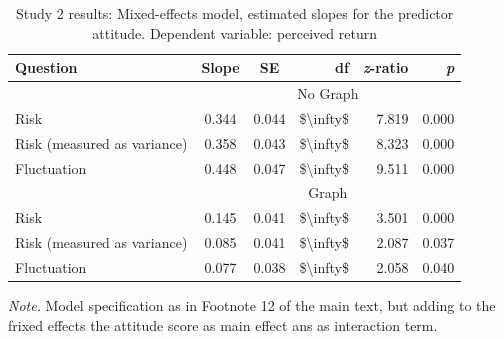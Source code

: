 \begin{table}[H]
\begin{center}
\begin{threeparttable}
\caption{Study 2 results: Mixed-effects model, estimated slopes for the predictor attitude. Dependent variable: perceived return}
\label{sup:tab:study2_attitude_lm_trends}
\begin{tabular}{lccrrr}
\toprule
Question & Slope & SE & df & \textit{z}-ratio & \textit{p}\\
\midrule
& \multicolumn{5}{c}{No Graph}\\
\cmidrule{2-6}
Risk & 0.344 & 0.044 & \$\textbackslash{}infty\$ & 7.819 & 0.000\\
Risk (measured as variance) & 0.358 & 0.043 & \$\textbackslash{}infty\$ & 8.323 & 0.000\\
Fluctuation & 0.448 & 0.047 & \$\textbackslash{}infty\$ & 9.511 & 0.000\\
\midrule
& \multicolumn{5}{c}{Graph}\\
\cmidrule{2-6}
Risk & 0.145 & 0.041 & \$\textbackslash{}infty\$ & 3.501 & 0.000\\
Risk (measured as variance) & 0.085 & 0.041 & \$\textbackslash{}infty\$ & 2.087 & 0.037\\
Fluctuation & 0.077 & 0.038 & \$\textbackslash{}infty\$ & 2.058 & 0.040\\
\bottomrule
\end{tabular}
\begin{tablenotes} \small
    \textit{Note.} Model specification as in Footnote 12 of the main text, but adding to the frixed effects the attitude score as main effect ans as interaction term.
\end{tablenotes}
\end{threeparttable}
\end{center}
\end{table}
